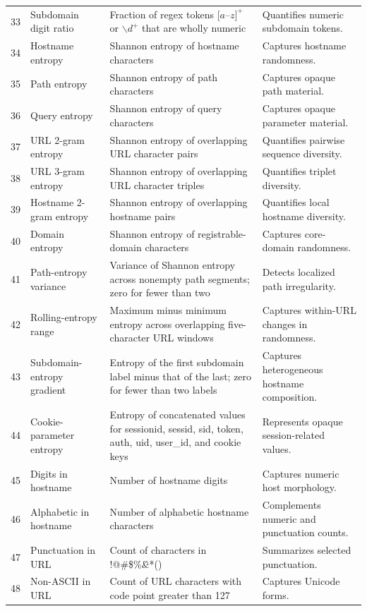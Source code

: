 \documentclass[10pt]{article}
\begin{document}
\begin{longtable}{r L{3.4cm} L{5.1cm} L{6.0cm}}
33 & Subdomain digit ratio & Fraction of regex tokens $[a$--$z]^+$ or $\backslash d^+$ that are wholly numeric & Quantifies numeric subdomain tokens. \\
34 & Hostname entropy & Shannon entropy of hostname characters & Captures hostname randomness. \\
35 & Path entropy & Shannon entropy of path characters & Captures opaque path material. \\
36 & Query entropy & Shannon entropy of query characters & Captures opaque parameter material. \\
37 & URL 2-gram entropy & Shannon entropy of overlapping URL character pairs & Quantifies pairwise sequence diversity. \\
38 & URL 3-gram entropy & Shannon entropy of overlapping URL character triples & Quantifies triplet diversity. \\
39 & Hostname 2-gram entropy & Shannon entropy of overlapping hostname pairs & Quantifies local hostname diversity. \\
40 & Domain entropy & Shannon entropy of registrable-domain characters & Captures core-domain randomness. \\
41 & Path-entropy variance & Variance of Shannon entropy across nonempty path segments; zero for fewer than two & Detects localized path irregularity. \\
42 & Rolling-entropy range & Maximum minus minimum entropy across overlapping five-character URL windows & Captures within-URL changes in randomness. \\
43 & Subdomain-entropy gradient & Entropy of the first subdomain label minus that of the last; zero for fewer than two labels & Captures heterogeneous hostname composition. \\
44 & Cookie-parameter entropy & Entropy of concatenated values for sessionid, sessid, sid, token, auth, uid, user\_id, and cookie keys & Represents opaque session-related values. \\
45 & Digits in hostname & Number of hostname digits & Captures numeric host morphology. \\
46 & Alphabetic in hostname & Number of alphabetic hostname characters & Complements numeric and punctuation counts. \\
47 & Punctuation in URL & Count of characters in !@\#\$\%\^\&*() & Summarizes selected punctuation. \\
48 & Non-ASCII in URL & Count of URL characters with code point greater than 127 & Captures Unicode forms. \\

\end{longtable}
\end{document}
